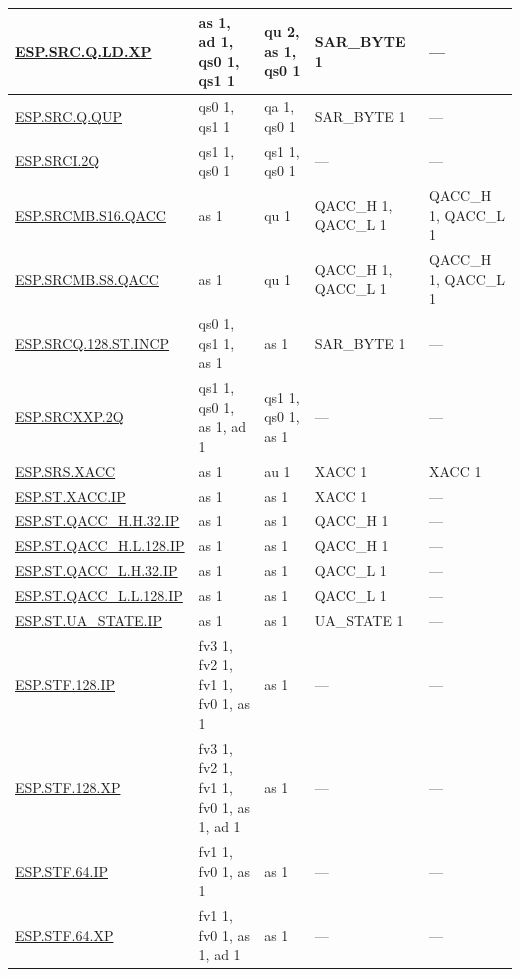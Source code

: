 \begin{longtable}[c]{|l|m{2.5cm}|m{2.5cm}|m{2.5cm}|m{2.5cm}|}
    \hyperref[instruction:ESPSRCQLDXP]{ESP.SRC.Q.LD.XP} & as 1, ad 1, qs0 1, qs1 1 & qu 2, as 1, qs0 1 & SAR\_BYTE 1 & — \\\hline
    \hyperref[instruction:ESPSRCQQUP]{ESP.SRC.Q.QUP} & qs0 1, qs1 1 & qa 1, qs0 1 & SAR\_BYTE 1 & — \\\hline
    \hyperref[instruction:ESPSRCI2Q]{ESP.SRCI.2Q} & qs1 1, qs0 1 & qs1 1, qs0 1 & — & — \\\hline
    \hyperref[instruction:ESPSRCMBS16QACC]{ESP.SRCMB.S16.QACC} & as 1 & qu 1 & QACC\_H 1, QACC\_L 1 & QACC\_H 1, QACC\_L 1\\\hline
    \hyperref[instruction:ESPSRCMBS8QACC]{ESP.SRCMB.S8.QACC} & as 1 & qu 1 & QACC\_H 1, QACC\_L 1 & QACC\_H 1, QACC\_L 1\\\hline
    \hyperref[instruction:ESPSRCQ128STINCP]{ESP.SRCQ.128.ST.INCP} & qs0 1, qs1 1, as 1 & as 1 & SAR\_BYTE 1 & — \\\hline
    \hyperref[instruction:ESPSRCXXP2Q]{ESP.SRCXXP.2Q} & qs1 1, qs0 1, as 1, ad 1 & qs1 1, qs0 1, as 1 & — & — \\\hline
    \hyperref[instruction:ESPSRSXACC]{ESP.SRS.XACC} & as 1 & au 1 & XACC 1 & XACC 1\\\hline
    \hyperref[instruction:ESPSTXACCIP]{ESP.ST.XACC.IP} & as 1 & as 1 & XACC 1 & — \\\hline
    \hyperref[instruction:ESPSTQACCHH32IP]{ESP.ST.QACC\_H.H.32.IP} & as 1 & as 1 & QACC\_H 1 & — \\\hline
    \hyperref[instruction:ESPSTQACCHL128IP]{ESP.ST.QACC\_H.L.128.IP} & as 1 & as 1 & QACC\_H 1 & — \\\hline
    \hyperref[instruction:ESPSTQACCLH32IP]{ESP.ST.QACC\_L.H.32.IP} & as 1 & as 1 & QACC\_L 1 & — \\\hline
    \hyperref[instruction:ESPSTQACCLL128IP]{ESP.ST.QACC\_L.L.128.IP} & as 1 & as 1 & QACC\_L 1 & — \\\hline
    \hyperref[instruction:ESPSTUASTATEIP]{ESP.ST.UA\_STATE.IP} & as 1 & as 1 & UA\_STATE 1 & — \\\hline
    \hyperref[instruction:ESPSTF128IP]{ESP.STF.128.IP} & fv3 1, fv2 1, fv1 1, fv0 1, as 1 & as 1 & — & — \\\hline
    \hyperref[instruction:ESPSTF128XP]{ESP.STF.128.XP} & fv3 1, fv2 1, fv1 1, fv0 1, as 1, ad 1 & as 1 & — & — \\\hline
    \hyperref[instruction:ESPSTF64IP]{ESP.STF.64.IP} & fv1 1, fv0 1, as 1 & as 1 & — & — \\\hline
    \hyperref[instruction:ESPSTF64XP]{ESP.STF.64.XP} & fv1 1, fv0 1, as 1, ad 1 & as 1 & — & — \\\hline

\end{longtable}
